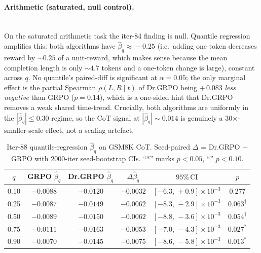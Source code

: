 \paragraph{Arithmetic (saturated, null control).}\leavevmode\\[-0.3em]
On the saturated arithmetic task the iter-84 finding is null.  Quantile
regression amplifies this: both algorithms have $\hat\beta_q\!\approx\!
-0.25$ (i.e.\ adding one token decreases reward by $\sim\!0.25$ of a
unit-reward, which makes sense because the mean completion length is
only $\sim\!4.7$ tokens and a one-token change is large), constant
across $q$.  No quantile's paired-diff is significant at $\alpha\!=\!0.05$;
the only marginal effect is the partial Spearman
$\rho(L,R\!\mid\! t)$ of Dr.GRPO being $+\,0.083$ \emph{less negative} than
GRPO ($p\!=\!0.14$), which is a one-sided hint that Dr.GRPO removes a
weak shared time-trend.  Crucially, both algorithms are uniformly in the
$|\hat\beta_q|\!\le\!0.30$ regime, so the CoT signal at $|\hat\beta_q|\!
\sim\!0.014$ is genuinely a 30$\times$-smaller-scale effect, not a
scaling artefact.

\begin{table}[t]
\centering\small
\caption{Iter-88 quantile-regression $\hat\beta_q$ on GSM8K CoT.  Seed-paired
$\Delta$ = Dr.GRPO $-$ GRPO with 2000-iter seed-bootstrap CIs.
``*'' marks $p\!<\!0.05$, ``\textdagger'' $p\!<\!0.10$.}\label{tab:lb-iter88-cot}
\begin{tabular}{cccccc}
\hline
$q$ & GRPO $\hat\beta_q$ & Dr.GRPO $\hat\beta_q$ & $\Delta\hat\beta_q$ &
$95\%\,\mathrm{CI}$ & $p$\\\hline
0.10 & $-0.0088$ & $-0.0120$ & $-0.0032$ & $[-6.3,\,+0.9]\!\times\!10^{-3}$ & 0.277\\
0.25 & $-0.0087$ & $-0.0149$ & $-0.0062$ & $[-8.3,\,-2.9]\!\times\!10^{-3}$ & $0.063^{\dagger}$\\
0.50 & $-0.0089$ & $-0.0150$ & $-0.0062$ & $[-8.8,\,-3.6]\!\times\!10^{-3}$ & $0.054^{\dagger}$\\
0.75 & $-0.0111$ & $-0.0163$ & $-0.0053$ & $[-7.0,\,-4.3]\!\times\!10^{-3}$ & $0.027^{*}$\\
0.90 & $-0.0070$ & $-0.0145$ & $-0.0075$ & $[-8.6,\,-5.8]\!\times\!10^{-3}$ & $0.013^{*}$\\\hline
\end{tabular}
\end{table}

